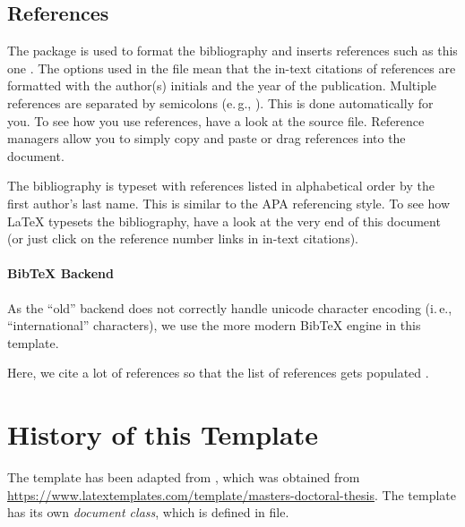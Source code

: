 \subsection{References}

The  package is used to format the bibliography and inserts references such as this one \parencite{murdoch_steven_j._chip_2010}. The options used in the  file mean that the in-text citations of references are formatted with the author(s) initials and the year \cite{anderson_ross_emv:_2014} of the publication. Multiple references are separated by semicolons (e.\,g., \cite{solat_security_2017, bond_chip_2014}). This is done automatically for you. To see how you use references, have a look at the  source file. Reference managers allow you to simply copy and paste or drag references into the document.

The bibliography is typeset with references listed in alphabetical order by the first author's last name. This is similar to the APA referencing style. To see how LaTeX typesets the bibliography, have a look at the very end of this document (or just click on the reference number links in in-text citations).

\paragraph{BibTeX Backend}

As the ``old''  backend does not correctly handle unicode character encoding (i.\,e., ``international'' characters), we use the more modern  BibTeX engine in this template.

Here, we cite a lot of references so that the list of references gets populated \cite{murdoch_steven_j._chip_2010,anderson_ross_emv:_2014,kou_weidong_secure_2003,solat_security_2017,bond_chip_2014,ortiz_s._is_2006,haselsteiner_security_2006,galloway_visa_2019,zhou_nshield_2014,lalehTaxonomyFraudsFraud2009,ferradiWhenOrganizedCrime2016,Yang10,Kopsell06,VilaGM03,Herrmann12-ipv6prefix,Herrmann14-diss,HBF:2013,Herrmann11-NordSec,AcarEEJND14,Herrmann09,WangG13,Raymond00,Hintz02,Herrmann14-encdns,Goodson12-privacy,WendolskyHF07,chaum81,BertholdFK00,Dingledine04,rfc5246,LoesingMD10,FuchsHF13}.


\section{History of this Template}
The template has been adapted from , which was obtained from \url{https://www.latextemplates.com/template/masters-doctoral-thesis}. The template has its own \emph{document class}, which is defined in  file.

